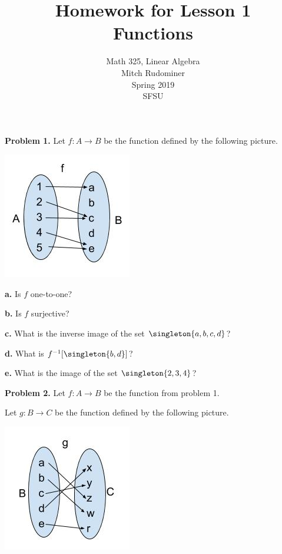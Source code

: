 \documentclass[oneside,12pt]{amsart}
\begin{document}
\title{Homework for Lesson 1 \\ Functions}
\author{Math 325, Linear Algebra \\ Mitch Rudominer \\ Spring 2019 \\ SFSU }
\date{}

\maketitle


\textbf{Problem 1.} Let $f:A\to B$ be the function defined by the following
picture.

\includegraphics[scale=0.25]{hw_function1}

\textbf{a.} Is $f$ one-to-one?

\smallskip

\textbf{b.} Is $f$ surjective?

\smallskip

\textbf{c.} What is the inverse image of the set $\singleton{a,b,c,d}$?

\medskip

\textbf{d.} What is $f^{-1}[\singleton{b, d}]$?

\medskip

\textbf{e.} What is the image of the set $\singleton{2,3,4}$?

\bigskip

\textbf{Problem 2.} Let $f:A\to B$ be the function from problem 1.

Let $g:B\to C$ be the function defined by the following
picture.

\includegraphics[scale=0.25]{hw_function2}
\end{document}
